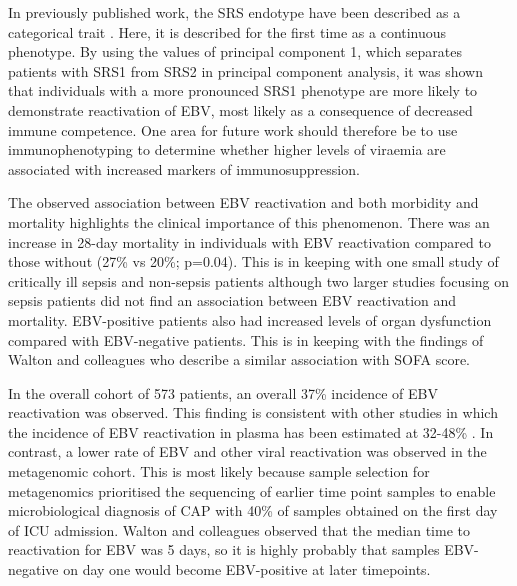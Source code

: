 In previously published work, the SRS endotype have been described as a categorical trait \parencite{Davenport2016}. Here, it is described for the first time as a continuous phenotype. By using the values of principal component 1, which separates patients with SRS1 from SRS2 in principal component analysis, it was shown that individuals with a more pronounced SRS1 phenotype are more likely to demonstrate reactivation of EBV, most likely as a consequence of decreased immune competence. One area for future work should therefore be to use immunophenotyping to determine whether higher levels of viraemia are associated with increased markers of immunosuppression.

The observed association between EBV reactivation and both morbidity and mortality highlights the clinical importance of this phenomenon. There was an increase in 28-day mortality in individuals with EBV reactivation compared to those without (27\% vs 20\%; p=0.04). This is in keeping with one small study of critically ill sepsis and non-sepsis patients \parencite{Libert2015} although two larger studies focusing on sepsis patients  \parencite{Walton2014} \parencite{Ong2017} did not find an association between EBV reactivation and mortality. EBV-positive patients also had increased levels of organ dysfunction compared with EBV-negative patients. This is in keeping with the findings of Walton and colleagues \parencite{Walton2014} who describe a similar association with SOFA score.

In the overall cohort of 573 patients, an overall 37\% incidence of EBV reactivation was observed. This finding is consistent with other studies in which the incidence of EBV reactivation in plasma has been estimated at 32-48\% \parencite{Walton2014} \parencite{Ong2017}. In contrast, a lower rate of EBV and other viral reactivation was observed in the metagenomic cohort. This is most likely because sample selection for metagenomics prioritised the sequencing of earlier time point samples to enable microbiological diagnosis of CAP with 40\% of samples obtained on the first day of ICU admission. Walton and colleagues \parencite{Walton2014} observed that the median time to reactivation for EBV was 5 days, so it is highly probably that samples EBV-negative on day one would become EBV-positive at later timepoints.

